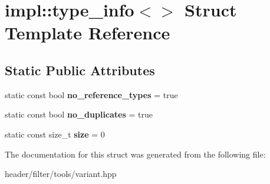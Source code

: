\hypertarget{structimpl_1_1type__info_3_4}{}\section{impl\+:\+:type\+\_\+info$<$$>$ Struct Template Reference}
\label{structimpl_1_1type__info_3_4}
\subsection*{Static Public Attributes}
\begin{DoxyCompactItemize}
\item 
\mbox{\label{structimpl_1_1type__info_3_4_a3d7191a40403800b2c4aefe21c349fba}} 
static const bool {\bfseries no\+\_\+reference\+\_\+types} = true
\item 
\mbox{\label{structimpl_1_1type__info_3_4_a946fac941e0483dbb4bffa9ae9ee7d14}} 
static const bool {\bfseries no\+\_\+duplicates} = true
\item 
\mbox{\label{structimpl_1_1type__info_3_4_a05a239bce80295679f4e4d260de8db82}} 
static const size\+\_\+t {\bfseries size} = 0
\end{DoxyCompactItemize}


The documentation for this struct was generated from the following file\+:\begin{DoxyCompactItemize}
\item 
header/filter/tools/variant.\+hpp\end{DoxyCompactItemize}
